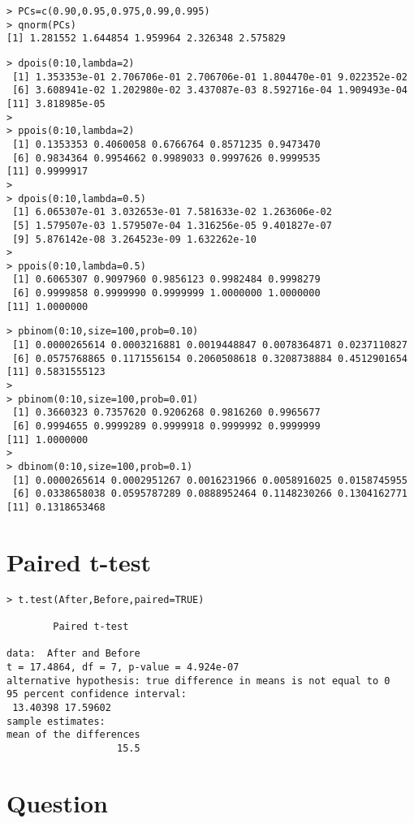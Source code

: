 \documentclass{article}
\begin{document}
\begin{verbatim}
> PCs=c(0.90,0.95,0.975,0.99,0.995)
> qnorm(PCs)
[1] 1.281552 1.644854 1.959964 2.326348 2.575829
\end{verbatim}
\begin{verbatim}
> dpois(0:10,lambda=2)
 [1] 1.353353e-01 2.706706e-01 2.706706e-01 1.804470e-01 9.022352e-02
 [6] 3.608941e-02 1.202980e-02 3.437087e-03 8.592716e-04 1.909493e-04
[11] 3.818985e-05
> 
> ppois(0:10,lambda=2)
 [1] 0.1353353 0.4060058 0.6766764 0.8571235 0.9473470
 [6] 0.9834364 0.9954662 0.9989033 0.9997626 0.9999535
[11] 0.9999917
>
> dpois(0:10,lambda=0.5)
 [1] 6.065307e-01 3.032653e-01 7.581633e-02 1.263606e-02
 [5] 1.579507e-03 1.579507e-04 1.316256e-05 9.401827e-07
 [9] 5.876142e-08 3.264523e-09 1.632262e-10
>
> ppois(0:10,lambda=0.5)
 [1] 0.6065307 0.9097960 0.9856123 0.9982484 0.9998279
 [6] 0.9999858 0.9999990 0.9999999 1.0000000 1.0000000
[11] 1.0000000
\end{verbatim}
\begin{verbatim}
> pbinom(0:10,size=100,prob=0.10)
 [1] 0.0000265614 0.0003216881 0.0019448847 0.0078364871 0.0237110827
 [6] 0.0575768865 0.1171556154 0.2060508618 0.3208738884 0.4512901654
[11] 0.5831555123
>
> pbinom(0:10,size=100,prob=0.01)
 [1] 0.3660323 0.7357620 0.9206268 0.9816260 0.9965677 
 [6] 0.9994655 0.9999289 0.9999918 0.9999992 0.9999999 
[11] 1.0000000
>
> dbinom(0:10,size=100,prob=0.1)
 [1] 0.0000265614 0.0002951267 0.0016231966 0.0058916025 0.0158745955
 [6] 0.0338658038 0.0595787289 0.0888952464 0.1148230266 0.1304162771
[11] 0.1318653468
\end{verbatim}
\newpage
\section{Paired t-test}
\begin{verbatim}
> t.test(After,Before,paired=TRUE)

        Paired t-test

data:  After and Before 
t = 17.4864, df = 7, p-value = 4.924e-07
alternative hypothesis: true difference in means is not equal to 0 
95 percent confidence interval:
 13.40398 17.59602 
sample estimates:
mean of the differences 
                   15.5 
\end{verbatim}
\section{Question }
\end{document}
